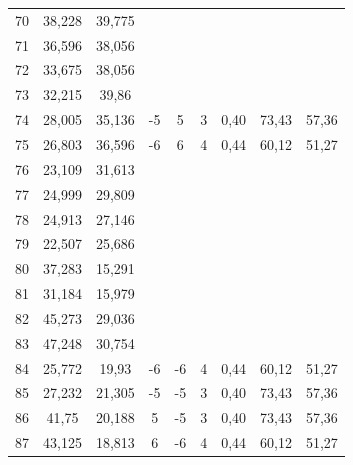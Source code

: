 \begin{table}
\begin{tabular}{ccccccccc}
70 & 38,228 & 39,775 &  &  &  &  &  & \\
71 & 36,596 & 38,056 &  &  &  &  &  & \\
72 & 33,675 & 38,056 &  &  &  &  &  & \\
73 & 32,215 & 39,86 &  &  &  &  &  & \\
74 & 28,005 & 35,136 & -5 & 5 & 3 & 0,40 & 73,43 & 57,36\\
75 & 26,803 & 36,596 & -6 & 6 & 4 & 0,44 & 60,12 & 51,27\\
76 & 23,109 & 31,613 &  &  &  &  &  & \\
77 & 24,999 & 29,809 &  &  &  &  &  & \\
78 & 24,913 & 27,146 &  &  &  &  &  & \\
79 & 22,507 & 25,686 &  &  &  &  &  & \\
80 & 37,283 & 15,291 &  &  &  &  &  & \\
81 & 31,184 & 15,979 &  &  &  &  &  & \\
82 & 45,273 & 29,036 &  &  &  &  &  & \\
83 & 47,248 & 30,754 &  &  &  &  &  & \\
84 & 25,772 & 19,93 & -6 & -6 & 4 & 0,44 & 60,12 & 51,27\\
85 & 27,232 & 21,305 & -5 & -5 & 3 & 0,40 & 73,43 & 57,36\\
86 & 41,75 & 20,188 & 5 & -5 & 3 & 0,40 & 73,43 & 57,36\\
87 & 43,125 & 18,813 & 6 & -6 & 4 & 0,44 & 60,12 & 51,27\\
\bottomrule
\end{tabular}
\end{table}